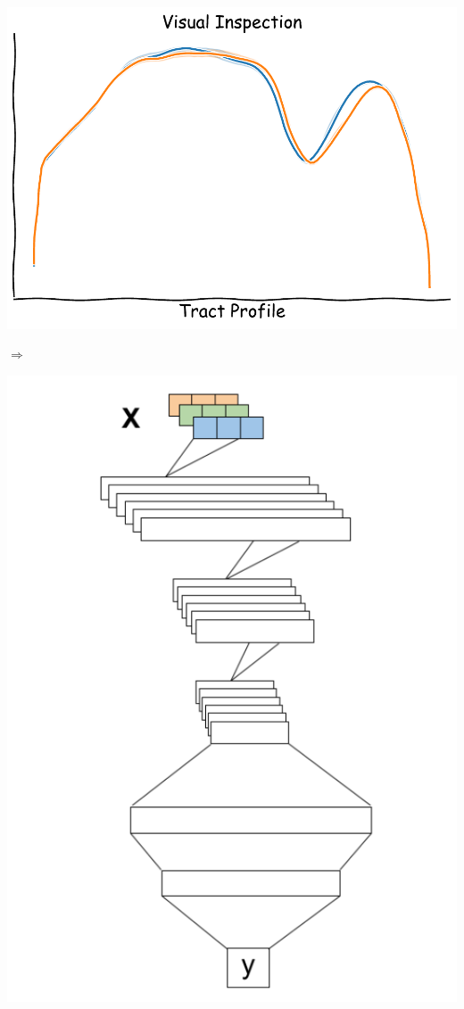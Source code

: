 \documentclass[a0paper,landscape,fontscale=0.385]{baposter}
\newenvironment{Figure}
  {\par\medskip\noindent\minipage{\linewidth}}
  {\endminipage\par\medskip}
\begin{document}
\begin{poster}
{\begin{minipage}[b]{0.35\textwidth}
    \begin{Figure}
        \centering
        \includegraphics[width=\linewidth]{tract_profile_diff.pdf}
    \end{Figure}
\end{minipage}
\begin{minipage}[b]{0.05\textwidth}
    \centering
    $\Longrightarrow$
    \vspace{5em}
\end{minipage}
\begin{minipage}[b]{0.18\textwidth}
    \begin{Figure}
        \centering
        \includegraphics[width=\linewidth]{convnet-schematic.pdf}

\end{Figure}
\end{minipage}}
\end{poster}
\end{document}
